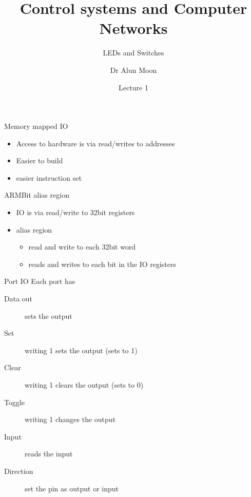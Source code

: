 \documentclass[xcolor=svgnames]{beamer}
\title{Control systems and Computer Networks}
\subtitle{LEDs and Switches}
\author{Dr Alun Moon}
\date{Lecture 1}
\begin{document}
\frame{\maketitle}


\begin{frame}{Memory mapped IO}
\begin{itemize}
    \item Access to hardware is via read/writes to addresses
    \item Easier to build
    \item easier instruction set

\end{itemize}
\end{frame}

\begin{frame}{ARM}{Bit alias region}
    \begin{itemize}
        \item IO is via read/write to 32bit registers
        \item alias region
        \begin{itemize}
            \item read and write to each 32bit word
            \item reads and writes to each bit in the IO registers
        \end{itemize}
    \end{itemize}

\end{frame}

\begin{frame}{Port IO}
    Each port has

\begin{description}
    \item[Data out] sets the output
    \item[Set   ] writing 1 sets the output (sets to 1)
    \item[Clear ] writing 1 clears the output (sets to 0)
    \item[Toggle] writing 1 changes the output
    \item[Input ] reads the input
    \item[Direction] set the pin as output or input
\end{description}

\end{frame}
\end{document}
